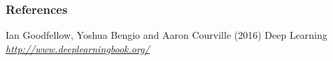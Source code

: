 


\begin{vbframe}
\frametitle{References}
\footnotesize{
\begin{thebibliography}{99}

 Ian Goodfellow, Yoshua Bengio and Aaron Courville (2016)
\newblock Deep Learning
\newblock \emph{\url{http://www.deeplearningbook.org/}}

\end{thebibliography}
}
\end{vbframe}

\endlecture

